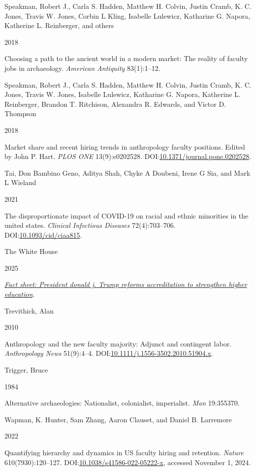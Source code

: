 \documentclass[
  12pt,
]{article}
\newlength{\cslhangindent}
\newlength{\csllabelwidth}
\newenvironment{CSLReferences}[2] %
 {\begin{list}{}{%
  \setlength{\itemindent}{0pt}
  \setlength{\leftmargin}{0pt}
  \setlength{\parsep}{0pt}
  \ifodd #1
   \setlength{\leftmargin}{\cslhangindent}
   \setlength{\itemindent}{-1\cslhangindent}
  \fi
  \setlength{\itemsep}{#2\baselineskip}}}
 {\end{list}}
\newcommand{\CSLBlock}[1]{\hfill\break\parbox[t]{\linewidth}{\strut\ignorespaces#1\strut}}
\newcommand{\CSLLeftMargin}[1]{\parbox[t]{\csllabelwidth}{\strut#1\strut}}
\newcommand{\CSLRightInline}[1]{\parbox[t]{\linewidth - \csllabelwidth}{\strut#1\strut}}
\begin{document}
\begin{CSLReferences}{0}{1}
\CSLBlock{Speakman, Robert J., Carla S. Hadden, Matthew H. Colvin,
Justin Cramb, K. C. Jones, Travis W. Jones, Corbin L Kling, Isabelle
Lulewicz, Katharine G. Napora, Katherine L. Reinberger, and others}
\CSLLeftMargin{ 2018}%
\CSLRightInline{Choosing a path to the ancient world in a modern market:
The reality of faculty jobs in archaeology. \emph{American Antiquity}
83(1):1--12.}

\CSLBlock{Speakman, Robert J., Carla S. Hadden, Matthew H. Colvin,
Justin Cramb, K. C. Jones, Travis W. Jones, Isabelle Lulewicz, Katharine
G. Napora, Katherine L. Reinberger, Brandon T. Ritchison, Alexandra R.
Edwards, and Victor D. Thompson}
\CSLLeftMargin{ 2018}%
\CSLRightInline{Market share and recent hiring trends in anthropology
faculty positions. Edited by John P. Hart. \emph{PLOS ONE}
13(9):e0202528.
DOI:\href{https://doi.org/10.1371/journal.pone.0202528}{10.1371/journal.pone.0202528}.}

\CSLBlock{Tai, Don Bambino Geno, Aditya Shah, Chyke A Doubeni, Irene G
Sia, and Mark L Wieland}
\CSLLeftMargin{ 2021}%
\CSLRightInline{The disproportionate impact of COVID-19 on racial and
ethnic minorities in the united states. \emph{Clinical Infectious
Diseases} 72(4):703--706.
DOI:\href{https://doi.org/10.1093/cid/ciaa815}{10.1093/cid/ciaa815}.}

\CSLBlock{The White House}
\CSLLeftMargin{ 2025}%
\CSLRightInline{\emph{\href{https://www.whitehouse.gov/fact-sheets/2025/04/fact-sheet-president-donald-j-trump-reforms-accreditation-to-strengthen-higher-education/}{Fact
sheet: President donald j. Trump reforms accreditation to strengthen
higher education}}.}

\CSLBlock{Trevithick, Alan}
\CSLLeftMargin{ 2010}%
\CSLRightInline{Anthropology and the new faculty majority: {Adjunct} and
contingent labor. \emph{Anthropology News} 51(9):4--4.
DOI:\href{https://doi.org/10.1111/j.1556-3502.2010.51904.x}{10.1111/j.1556-3502.2010.51904.x}.}

\CSLBlock{Trigger, Bruce}
\CSLLeftMargin{ 1984}%
\CSLRightInline{Alternative archaeologies: Nationalist, colonialist,
imperialist. \emph{Man} 19:355370.}

\CSLBlock{Wapman, K. Hunter, Sam Zhang, Aaron Clauset, and Daniel B.
Larremore}
\CSLLeftMargin{ 2022}%
\CSLRightInline{Quantifying hierarchy and dynamics in {US} faculty
hiring and retention. \emph{Nature} 610(7930):120--127.
DOI:\href{https://doi.org/10.1038/s41586-022-05222-x}{10.1038/s41586-022-05222-x},
accessed November 1, 2024.}


\end{CSLReferences}
\end{document}
